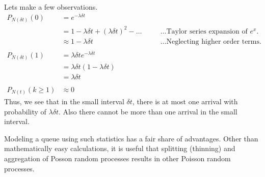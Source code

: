 \documentclass[11pt, a4paper]{report}
\begin{document}
Lets make a few observations.
\begin{subequations}
    \begin{align}
        P_{N(\delta t)}(0) &= e^{-\lambda \delta t} \\
        &= 1 - \lambda \delta t + (\lambda \delta t)^2 - \ldots &&\quad \ldots \text{Taylor series expansion of } e^x.\\
        &\approx 1 - \lambda \delta t &&\quad \ldots \text{Neglecting higher order terms}.\\
        \\
        P_{N(\delta t)}(1) &= \lambda \delta t e^{-\lambda \delta t} \\ 
        &= \lambda \delta t (1 - \lambda \delta t) \\
        &= \lambda \delta t \\
        \\
        P_{N(t)}(k \geq 1) &\approx 0
    \end{align}    
    \label{eq:ApproxAssumptions}
\end{subequations}
Thus, we see that in the small interval $\delta t$, there is at most one arrival with probability of $\lambda \delta t$. Also there cannot be more than one arrival in the small interval.


Modeling a queue using such statistics has a fair share of advantages. Other than mathematically easy calculations, it is useful that splitting (thinning) and aggregation of Posson random processes results in other Poisson random processes.
\end{document}
